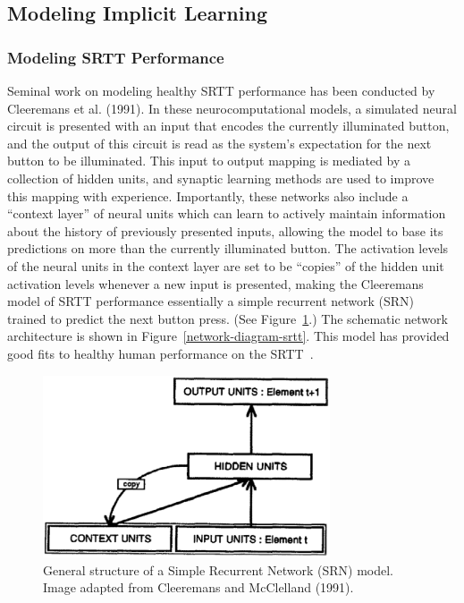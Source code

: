 \subsection{Modeling Implicit Learning}

\subsubsection{Modeling SRTT Performance}
Seminal work on modeling healthy SRTT performance has been conducted by \nocite{Cleeremans:1991:SSRT} Cleeremans et al. (1991).  In these neurocomputational models, a simulated neural circuit is presented with an input that encodes the currently illuminated button, and the output of this circuit is read as the system's expectation for the next button to be illuminated.  This input to output mapping is mediated by a collection of hidden units, and synaptic learning methods are used to improve this mapping with experience.  Importantly, these networks also include a ``context layer'' of neural units which can learn to actively maintain information about the history of previously presented inputs, allowing the model to base its predictions on more than the currently illuminated button.  The activation levels of the neural units in the context layer are set to be ``copies'' of the hidden unit activation levels whenever a new input is presented, making the Cleeremans model of SRTT performance essentially a simple recurrent network (SRN)~\cite{ElmanJ:1990:SRN} trained to predict the next button press. (See Figure~\ref{SRN-Model}.) The schematic network architecture is shown in Figure~\ref{network-diagram-srtt}.  This model has provided good fits to healthy human performance on the SRTT~\cite{Cleeremans:1991:SSRT}. 

\begin{figure}[t]
\begin{center}
	\includegraphics[width=85mm]{figures/srn.eps}
\end{center}
\caption{General structure of a Simple Recurrent Network (SRN) model.  Image adapted from Cleeremans and McClelland (1991).}
\label{SRN-Model}
\end{figure} 

